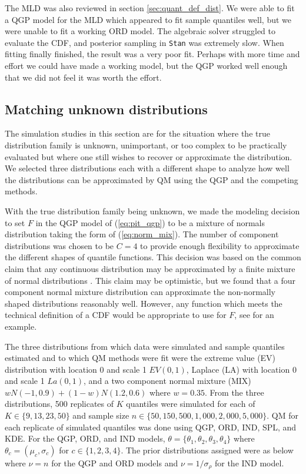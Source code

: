 \documentclass[preprint,12pt,authoryear]{elsarticle}
\begin{document}
 The MLD was also reviewed in section \ref{sec:quant_def_dist}. We were able to fit a QGP model for the MLD which appeared to fit sample quantiles well, but we were unable to fit a working ORD model. The algebraic solver struggled to evaluate the CDF, and posterior sampling in \texttt{Stan} was extremely slow. When fitting finally finished, the result was a very poor fit. Perhaps with more time and effort we could have made a working model, but the QGP worked well enough that we did not feel it was worth the effort.





\subsection{Matching unknown distributions} \label{sec:uk_matching}

The simulation studies in this section are for the situation where the true distribution family is unknown, unimportant, or too complex to be practically evaluated but where one still wishes to recover or approximate the distribution. We selected three distributions each with a different shape to analyze how well the distributions can be approximated by QM using the QGP and the competing methods. 

With the true distribution family being unknown, we made the modeling decision to set $F$ in the QGP model of (\ref{eq:pit_qgp}) to be a mixture of normals distribution taking the form of (\ref{eq:norm_mix}). The number of component distributions was chosen to be $C = 4$ to provide enough flexibility to approximate the different shapes of quantile functions. This decision was based on the common claim that any continuous distribution may be approximated by a finite mixture of normal distributions \cite[]{peel2000finite,nguyen2019approximations,nguyen2020approximation}. This claim may be optimistic, but we found that a four component normal mixture distribution can approximate the non-normally shaped distributions reasonably well. However, any function which meets the technical definition of a CDF would be appropriate to use for $F$, see \cite{gasthaus2019probabilistic} for an example.



The three distributions from which data were simulated and sample quantiles estimated and to which QM methods were fit were the extreme value (EV) distribution with location 0 and scale 1 $EV(0,1)$, Laplace (LA) with location 0 and scale 1 $La(0,1)$, and a two component normal mixture (MIX) $w N(-1, 0.9) + (1-w)N(1.2, 0.6)$ where $w = 0.35$. From the three distributions, 500 replicates of $K$ quantiles were simulated for each of 
$K \in \{9, 13, 23, 50\}$ and sample size $n \in \{50, 150, 500, 1{,}000, 2{,}000, 5{,}000\}$. QM for each replicate of simulated quantiles was done using QGP, ORD, IND, SPL, and KDE. For the QGP, ORD, and IND models, $\theta = \{\theta_1, \theta_2, \theta_3, \theta_4\}$ where $\theta_c = (\mu_c, \sigma_c)$ for $c \in \{1,2,3,4\}$. The prior distributions assigned were as below where $\nu = n$ for the QGP and ORD models and $\nu = 1/\sigma_{\rho}$ for the IND model. 
\end{document}
